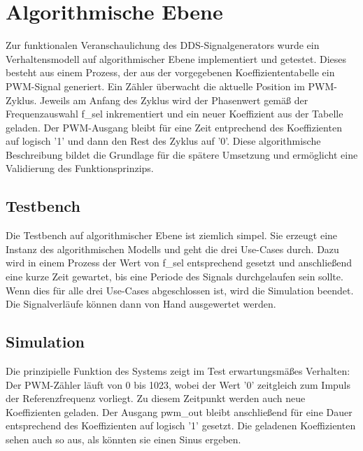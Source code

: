 \section{Algorithmische Ebene}
\label{sec:algo}
Zur funktionalen Veranschaulichung des DDS-Signalgenerators wurde ein Verhaltensmodell auf algorithmischer Ebene implementiert und getestet.
Dieses besteht aus einem Prozess, der aus der vorgegebenen Koeffiziententabelle ein PWM-Signal generiert.
Ein Zähler überwacht die aktuelle Position im PWM-Zyklus.
Jeweils am Anfang des Zyklus wird der Phasenwert gemäß der Frequenzauswahl f\_sel inkrementiert und ein neuer Koeffizient aus der Tabelle geladen.
Der PWM-Ausgang bleibt für eine Zeit entprechend des Koeffizienten auf logisch '1' und dann den Rest des Zyklus auf '0'.
Diese algorithmische Beschreibung bildet die Grundlage für die spätere Umsetzung und ermöglicht eine Validierung des Funktionsprinzips.

\subsection{Testbench}
\label{subsec:tb_algo}
Die Testbench auf algorithmischer Ebene ist ziemlich simpel.
Sie erzeugt eine Instanz des algorithmischen Modells und geht die drei Use-Cases durch.
Dazu wird in einem Prozess der Wert von f\_sel entsprechend gesetzt und anschließend eine kurze Zeit gewartet, bis eine Periode des Signals durchgelaufen sein sollte.
Wenn dies für alle drei Use-Cases abgeschlossen ist, wird die Simulation beendet.
Die Signalverläufe können dann von Hand ausgewertet werden.

\subsection{Simulation}
\label{subsec:sim_algo}
Die prinzipielle Funktion des Systems zeigt im Test erwartungsmäßes Verhalten:
Der PWM-Zähler läuft von 0 bis 1023, wobei der Wert '0' zeitgleich zum Impuls der Referenzfrequenz vorliegt.
Zu diesem Zeitpunkt werden auch neue Koeffizienten geladen.
Der Ausgang pwm\_out bleibt anschließend für eine Dauer entsprechend des Koeffizienten auf logisch '1' gesetzt.
Die geladenen Koeffizienten sehen auch so aus, als könnten sie einen Sinus ergeben.

